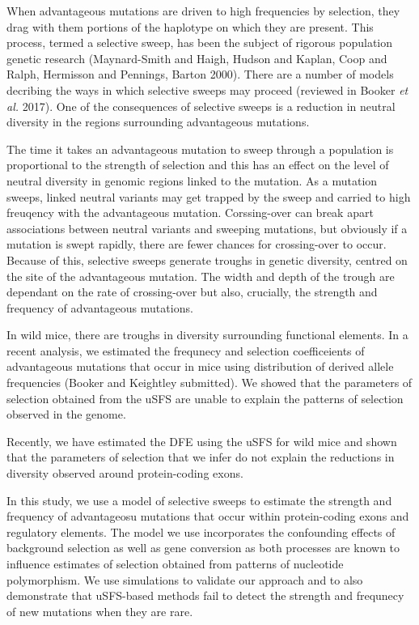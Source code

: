 \documentclass[11pt]{article}
\begin{document}
When advantageous mutations are driven to high frequencies by selection, they drag with them portions of the haplotype on which they are present. This process, termed a selective sweep, has been the subject of rigorous population genetic research (Maynard-Smith and Haigh, Hudson and Kaplan, Coop and Ralph, Hermisson and Pennings, Barton 2000). There are a number of models decribing the ways in which selective sweeps may proceed (reviewed in Booker \textit{et al.} 2017). One of the consequences of selective sweeps is a reduction in neutral diversity in the regions surrounding advantageous mutations. 

The time it takes an advantageous mutation to sweep through a population is proportional to the strength of selection and this has an effect on the level of neutral diversity in genomic regions linked to the mutation. As a mutation sweeps, linked neutral variants may get trapped by the sweep and carried to high freuqency with the advantageous mutation. Corssing-over can break apart associations between neutral variants and sweeping mutations, but obviously if a mutation is swept rapidly, there are fewer chances for crossing-over to occur. Because of this, selective sweeps generate troughs in genetic diversity, centred on the site of the advantageous mutation. The width and depth of the trough are dependant on the rate of crossing-over but also, crucially, the strength and frequency of advantageous mutations.

In wild mice, there are troughs in diversity surrounding functional elements. In a recent analysis, we estimated the frequnecy and selection coefficeients of advantageous mutations that occur in mice using distribution of derived allele frequencies (Booker and Keightley submitted). We showed that the parameters of selection obtained from the uSFS are unable to explain the patterns of selection observed in the genome.

Recently, we have estimated the DFE using the uSFS for wild mice and shown that the parameters of selection that we infer do not explain the reductions in diversity observed around protein-coding exons. 

In this study, we use a model of selective sweeps to estimate the strength and frequency of advantageosu mutations that occur within protein-coding exons and regulatory elements. The model we use incorporates the confounding effects of background selection as well as gene conversion as both processes are known to influence estimates of selection obtained from patterns of nucleotide polymorphism. We use simulations to validate our approach and to also demonstrate that uSFS-based methods fail to detect the strength and frequnecy of new mutations when they are rare.
\end{document}
